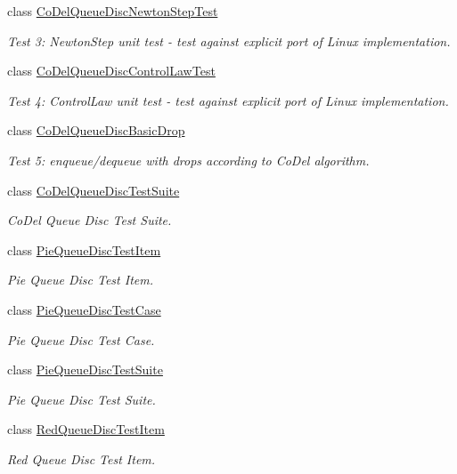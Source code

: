 \begin{DoxyCompactItemize}
class \hyperlink{classCoDelQueueDiscNewtonStepTest}{Co\+Del\+Queue\+Disc\+Newton\+Step\+Test}
\begin{DoxyCompactList}\small\item\em Test 3\+: Newton\+Step unit test -\/ test against explicit port of Linux implementation. \end{DoxyCompactList}\item 
class \hyperlink{classCoDelQueueDiscControlLawTest}{Co\+Del\+Queue\+Disc\+Control\+Law\+Test}
\begin{DoxyCompactList}\small\item\em Test 4\+: Control\+Law unit test -\/ test against explicit port of Linux implementation. \end{DoxyCompactList}\item 
class \hyperlink{classCoDelQueueDiscBasicDrop}{Co\+Del\+Queue\+Disc\+Basic\+Drop}
\begin{DoxyCompactList}\small\item\em Test 5\+: enqueue/dequeue with drops according to Co\+Del algorithm. \end{DoxyCompactList}\item 
class \hyperlink{classCoDelQueueDiscTestSuite}{Co\+Del\+Queue\+Disc\+Test\+Suite}
\begin{DoxyCompactList}\small\item\em Co\+Del Queue Disc Test Suite. \end{DoxyCompactList}\item 
class \hyperlink{classPieQueueDiscTestItem}{Pie\+Queue\+Disc\+Test\+Item}
\begin{DoxyCompactList}\small\item\em Pie Queue Disc Test Item. \end{DoxyCompactList}\item 
class \hyperlink{classPieQueueDiscTestCase}{Pie\+Queue\+Disc\+Test\+Case}
\begin{DoxyCompactList}\small\item\em Pie Queue Disc Test Case. \end{DoxyCompactList}\item 
class \hyperlink{classPieQueueDiscTestSuite}{Pie\+Queue\+Disc\+Test\+Suite}
\begin{DoxyCompactList}\small\item\em Pie Queue Disc Test Suite. \end{DoxyCompactList}\item 
class \hyperlink{classRedQueueDiscTestItem}{Red\+Queue\+Disc\+Test\+Item}
\begin{DoxyCompactList}\small\item\em Red Queue Disc Test Item. \end{DoxyCompactList}\item 

\end{DoxyCompactItemize}
